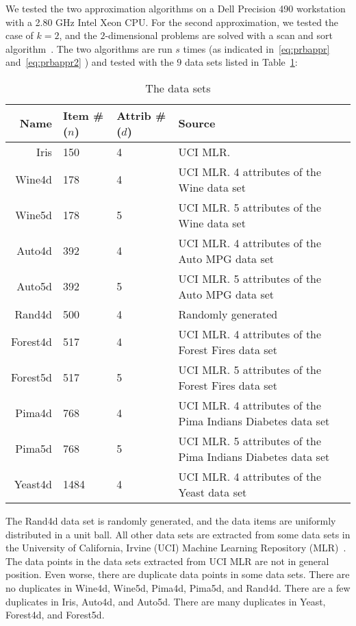 \documentclass[preprint, 12pt]{elsarticle}
\begin{document}
We tested the two approximation algorithms on a Dell Precision 490 workstation with a 2.80 GHz Intel Xeon CPU. For the second approximation, we tested the case of $k=2$, and the $2$-dimensional problems are solved with a scan and sort algorithm~\cite{Rousseeuw98}. The two algorithms are run $s$ times (as indicated in~\eqref{eq:prbappr} and~\eqref{eq:prbappr2} ) and tested with the $9$ data sets listed in Table~\ref{tab:datasets}:
\begin{table}[!htb]
  \centering
  \begin{tabular}[center]{|r|l|l|p{8cm}|}
    \hline
    Name & Item \# ($n$) & Attrib \# ($d$)& Source \\
    \hline
    Iris &  150 & 4 & UCI MLR. \\
    Wine4d &  178 & 4 & UCI MLR. 4 attributes of the Wine data set\\
    Wine5d &  178 & 5 & UCI MLR. 5 attributes of the Wine data set\\
    Auto4d &  392 & 4 & UCI MLR. 4 attributes of the Auto MPG data set\\
    Auto5d &  392 & 5 & UCI MLR. 5 attributes of the Auto MPG data set\\
    Rand4d &  500 & 4 & Randomly generated\\
    Forest4d &  517 & 4 & UCI MLR. 4 attributes of the Forest Fires data set~\cite{Cortez07}\\
    Forest5d &  517 & 5 & UCI MLR. 5 attributes of the Forest Fires data set~\cite{Cortez07}\\
    Pima4d &  768 & 4 & UCI MLR. 4 attributes of the Pima Indians Diabetes data set\\
    Pima5d &  768 & 5 & UCI MLR. 5 attributes of the Pima Indians Diabetes data set\\
    Yeast4d &  1484 & 4 & UCI MLR. 4 attributes of the Yeast data set\\
    \hline
  \end{tabular}
  \caption{The data sets}
  \label{tab:datasets}
\end{table}

The Rand4d data set is randomly generated, and the data items are uniformly distributed in a unit ball. All other data sets are extracted from some data sets in the University of California, Irvine (UCI) Machine Learning Repository (MLR)~\cite{ucimlr07}. 
The data points in the data sets extracted from UCI MLR are not in general position. Even worse, there are duplicate data points in some data sets. There are no duplicates in Wine4d, Wine5d, Pima4d, Pima5d, and Rand4d. There are a few duplicates in Iris, Auto4d, and Auto5d. There are many duplicates in Yeast, Forest4d, and Forest5d.
\end{document}
